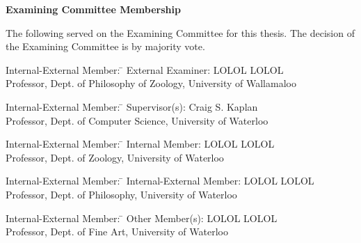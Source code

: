 \cleardoublepage %

 
\begin{center}\textbf{Examining Committee Membership}\end{center}
  \noindent
The following served on the Examining Committee for this thesis. The decision of the Examining Committee is by majority vote.
  \bigskip
  
  \noindent
\begin{tabbing}
Internal-External Member: \=  \kill %
External Examiner: \>  LOLOL LOLOL \\ 
\> Professor, Dept. of Philosophy of Zoology, University of Wallamaloo \\
\end{tabbing} 
  \bigskip
  
  \noindent
\begin{tabbing}
Internal-External Member: \=  \kill %
Supervisor(s): \> Craig S. Kaplan \\
\> Professor, Dept. of Computer Science, University of Waterloo \\
\end{tabbing}
  \bigskip
  
  \noindent
  \begin{tabbing}
Internal-External Member: \=  \kill %
Internal Member: \> LOLOL LOLOL \\
\> Professor, Dept. of Zoology, University of Waterloo \\
\end{tabbing}
  \bigskip
  
  \noindent
\begin{tabbing}
Internal-External Member: \=  \kill %
Internal-External Member: \> LOLOL LOLOL \\
\> Professor, Dept. of Philosophy, University of Waterloo \\
\end{tabbing}
  \bigskip
  
  \noindent
\begin{tabbing}
Internal-External Member: \=  \kill %
Other Member(s): \> LOLOL LOLOL \\
\> Professor, Dept. of Fine Art, University of Waterloo \\
\end{tabbing}

